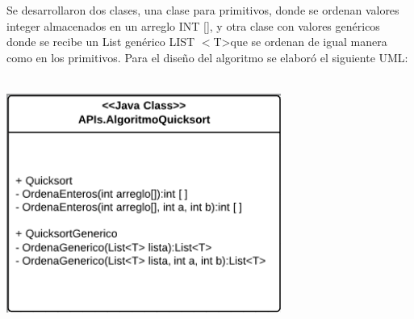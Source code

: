 \documentclass[12pt,letterpaper]{article}
\begin{document}
\vskip 0.4cm
Se desarrollaron dos clases, una clase para primitivos, donde se ordenan valores integer almacenados en un arreglo INT [], y otra clase con valores genéricos donde se recibe un List genérico LIST $<$T\textgreater que se ordenan de igual manera como en los primitivos.
\vskip 0.4cm
Para el diseño del algoritmo se elaboró el siguiente UML:
\vskip 0.2cm
\includegraphics[width=9cm,height=9cm]{Imagen7} 
\newpage
\end{document}
